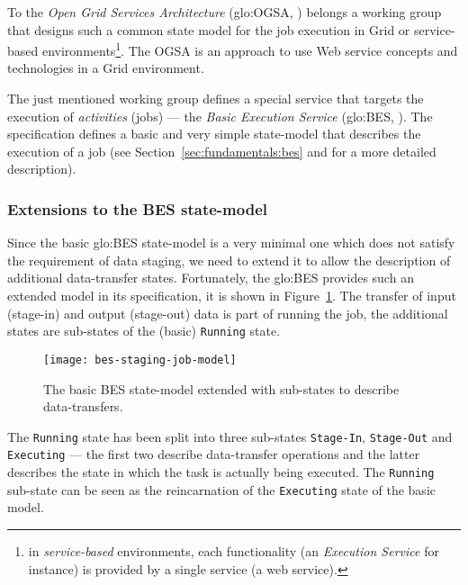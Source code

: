 To   the   \emph{Open   Grid   Services   Architecture}   (\gls{glo:OGSA},
\cite{ogsa})  belongs a  working group  that designs  such a  common state
model    for    the   job    execution    in    Grid   or    service-based
environments\footnote{in     \emph{service-based}    environments,    each
  functionality (an \emph{Execution Service}  for instance) is provided by
  a single service (\eg a web service).}.  The OGSA is an approach to use
Web service concepts and technologies in a Grid environment.

The just  mentioned working group  defines a special service  that targets
the  execution  of   \emph{activities}  (\eg jobs)  ---  the  \emph{Basic
  Execution Service}  (\gls{glo:BES}, \cite{ogsa-bes}).  The specification
defines a basic  and very simple state-model that  describes the execution
of a job (see Section~\ref{sec:fundamentals:bes} and \cite{ogsa-bes} for a
more detailed description).

\subsubsection{Extensions to the BES state-model}

Since the basic \gls{glo:BES} state-model is a very minimal one which does
not satisfy the requirement of data staging, we need to extend it to allow
the  description  of additional  data-transfer  states.  Fortunately,  the
\gls{glo:BES} provides such an extended  model in its specification, it is
shown in  Figure~\ref{fig:bes-extended}. The transfer  of input (stage-in)
and  output  (stage-out)  data  is  part  of  running  the  job,  \ie the
additional states are sub-states of the (basic) \texttt{Running} state.

\begin{figure}
  \centering
  \texttt{[image: bes-staging-job-model]}
  \caption[BES State Model Staging Extension]{The basic BES state-model
    extended with sub-states to describe data-transfers.}
  \label{fig:bes-extended}
\end{figure}

The  \texttt{Running}   state  has   been  split  into   three  sub-states
\texttt{Stage-In}, \texttt{Stage-Out} and \texttt{Executing} --- the first
two describe  data-transfer operations and the latter  describes the state
in  which  the task  is  actually  being  executed.  The  \texttt{Running}
sub-state can be seen as the reincarnation of the \texttt{Executing} state
of the  basic model.

